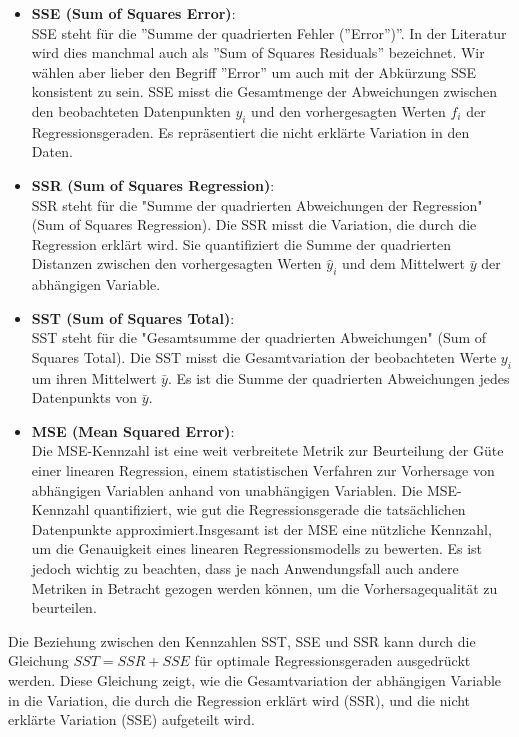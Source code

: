 \documentclass[12pt]{article}
\begin{document}
\begin{itemize}
\item \textbf{SSE (Sum of Squares Error)}: \\ 
SSE steht für die ”Summe der quadrierten Fehler (”Error”)”. In der Literatur wird dies manchmal auch als ”Sum of Squares Residuals” bezeichnet. Wir wählen aber lieber den Begriff ”Error” um auch mit der Abkürzung SSE konsistent zu sein. SSE misst die Gesamtmenge der Abweichungen zwischen den beobachteten Datenpunkten $y_i$ und den vorhergesagten Werten $ f_i $ der Regressionsgeraden. Es repräsentiert die nicht erklärte Variation in den Daten. 
    
\item \textbf{SSR (Sum of Squares Regression)}: \\
SSR steht für die "Summe der quadrierten Abweichungen der Regression" (Sum of Squares Regression). Die SSR misst die Variation, die durch die Regression erklärt wird. Sie quantifiziert die Summe der quadrierten Distanzen zwischen den vorhergesagten Werten \(\hat{y}_i\) und dem Mittelwert \(\bar{y}\) der abhängigen Variable.
    
\item \textbf{SST (Sum of Squares Total)}: \\ SST steht für die "Gesamtsumme der quadrierten Abweichungen" (Sum of Squares Total). Die SST misst die Gesamtvariation der beobachteten Werte \(y_i\) um ihren Mittelwert \(\bar{y}\). Es ist die Summe der quadrierten Abweichungen jedes Datenpunkts von \(\bar{y}\).

\item \textbf{MSE (Mean Squared Error)}:\\ Die MSE-Kennzahl ist eine weit verbreitete Metrik zur Beurteilung der Güte einer linearen Regression, einem statistischen Verfahren zur Vorhersage von abhängigen Variablen anhand von unabhängigen Variablen. Die MSE-Kennzahl quantifiziert, wie gut die Regressionsgerade die tatsächlichen Datenpunkte approximiert.Insgesamt ist der MSE eine nützliche Kennzahl, um die Genauigkeit eines linearen Regressionsmodells zu bewerten. Es ist jedoch wichtig zu beachten, dass je nach Anwendungsfall auch andere Metriken in Betracht gezogen werden können, um die Vorhersagequalität zu beurteilen.
\end{itemize}
%
Die Beziehung zwischen den Kennzahlen SST, SSE und SSR kann durch die Gleichung \(SST = SSR + SSE\) für optimale Regressionsgeraden ausgedrückt werden. Diese Gleichung zeigt, wie die Gesamtvariation der abhängigen Variable in die Variation, die durch die Regression erklärt wird (SSR), und die nicht erklärte Variation (SSE) aufgeteilt wird.\\[0.2 cm]
\end{document}
